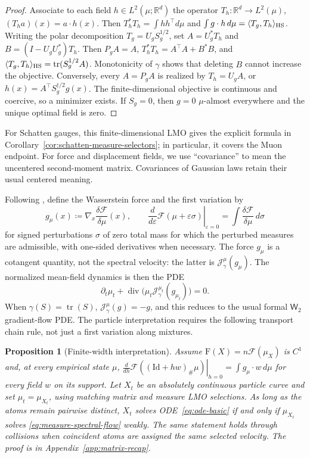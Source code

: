 \documentclass{article}
\newtheorem{proposition}[theorem]{Proposition}
\newcommand{\R}{\mathbb{R}}
\newcommand{\mF}{\mathrm{F}}
\newcommand{\MF}{\mathcal{F}}
\newcommand{\MJ}{\mathcal{J}}
\newcommand{\Wtwo}{\mathsf{W}_2}
\newcommand{\tr}{\operatorname{tr}}
\newcommand{\divv}{\operatorname{div}}
\newcommand{\Id}{\mathrm{Id}}
\begin{document}
\begin{proof}
Associate to each
field $h\in L^2(\mu;\R^d)$ the operator
$T_h:\R^d\to L^2(\mu)$, $(T_ha)(x)=a\cdot h(x)$.  Then
$T_h^*T_h=\int hh^\top d\mu$ and
$\int g\cdot h\,d\mu=\langle T_g,T_h\rangle_{\rm HS}$.  Writing the polar
decomposition $T_g=U_gS_g^{1/2}$, set $A=U_g^*T_h$ and
$B=(I-U_gU_g^*)T_h$. Then $P_gA=A$,
$T_h^*T_h=A^\top A+B^*B$, and
$\langle T_g,T_h\rangle_{\rm HS}=\tr(S_g^{1/2}A)$.
Monotonicity of $\gamma$ shows that deleting $B$ cannot increase the
objective. Conversely, every $A=P_gA$ is realized by $T_h=U_gA$, or
$h(x)=A^\top S_g^{\dagger/2}g(x)$. The finite-dimensional objective is
continuous and coercive, so a minimizer exists. If $S_g=0$, then $g=0$
$\mu$-almost everywhere and the unique optimal field is zero.
\end{proof}
For Schatten gauges, this finite-dimensional LMO gives the explicit formula in
Corollary~\ref{cor:schatten-measure-selectors}; in particular, it covers the
Muon endpoint.
For force and displacement fields, we use ``covariance'' to mean the
uncentered second-moment matrix. Covariances of Gaussian laws retain their
usual centered meaning.

Following \citet{AmbrosioGigliSavare2008}, define the Wasserstein force and
the first variation by
\[
    g_\mu(x)\coloneqq
    \nabla_x\frac{\delta\MF}{\delta\mu}(x),
    \qquad
    \left.\frac{d}{d\varepsilon}\MF(\mu+\varepsilon\sigma)
    \right|_{\varepsilon=0}
    =
    \int \frac{\delta\MF}{\delta\mu}\,d\sigma
\]
for signed perturbations $\sigma$ of zero total mass for which the perturbed
measures are admissible, with one-sided derivatives when necessary.
The force $g_\mu$ is a cotangent quantity, not the spectral velocity:
the latter is $\MJ_\gamma^\mu(g_\mu)$.
%
The normalized mean-field dynamics is then the PDE 
\begin{equation}
\label{eq:measure-spectral-flow}
\partial_t\mu_t+\divv\!\bigl(\mu_t \MJ_\gamma^{\mu_t}(g_{\mu_t})\bigr)=0.
\end{equation}
When $\gamma(S)=\tr(S)$, $\MJ_\gamma^\mu(g)=-g$, and this reduces to the
usual formal $\Wtwo$ gradient-flow PDE. The particle interpretation requires
the following transport chain rule, not just a first variation along mixtures.

\begin{proposition}[Finite-width interpretation]
\label{cor:particle}
Assume $\mF(X)=n\MF(\mu_X)$ is $C^1$ and, at every empirical state $\mu$,
$\left.\frac{d}{dh}\MF((\Id+hw)_\#\mu)\right|_{h=0}
=\int g_\mu\cdot w\,d\mu$ for every field $w$ on its support.
Let $X_t$ be an absolutely continuous particle curve and set $\mu_t=\mu_{X_t}$,
using matching matrix and measure LMO selections.
%
As long as the atoms remain pairwise distinct, $X_t$ solves
ODE~\eqref{eq:ode-basic} if and only if $\mu_{X_t}$ solves
\eqref{eq:measure-spectral-flow} weakly. The same statement holds through
collisions when coincident atoms are assigned the same selected velocity.
The proof is in Appendix~\ref{app:matrix-recap}.
\end{proposition}
\end{document}
